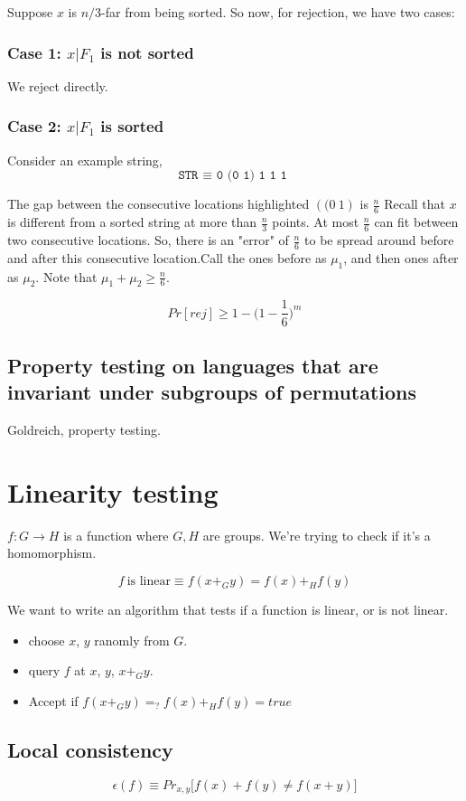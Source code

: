 Suppose $x$ is $n/3$-far from being sorted. So now, for rejection, we have two
cases:

\subsubsection{Case 1: $x|F_1$ is not sorted}
We reject directly.

\subsubsection{Case 2: $x|F_1$ is sorted}
Consider an example string,
$$\texttt{STR $\equiv$ 0~(0~1)~1~1~1~}$$

The gap between the consecutive locations highlighted $(\texttt(0~1)$ is $\frac{n}{6}$
Recall that $x$ is different from a sorted string at more than $\frac{n}{3}$ points.
At most $\frac{n}{6}$ can fit between two consecutive locations. So, there
is an "error" of $\frac{n}{6}$ to be spread around before and after this
consecutive location.Call the ones before as $\mu_1$, and then ones after
as $\mu_2$. Note that $\mu_1 + \mu_2 \geq \frac{n}{6}$.

$$Pr[rej] \geq 1 - \bigg(1 - \frac{1}{6} \bigg)^m$$

\subsection{Property testing on languages that are invariant under subgroups of permutations}
Goldreich, property testing.


\section{Linearity testing}
$f: G \to H$ is a function where $G, H$ are groups.  We're trying to check
if it's a homomorphism.

$$f~\text{is linear} \equiv f (x +_G y) = f(x) +_H f(y)$$

We want to write an algorithm that tests if a function is linear, or is not
linear.

\begin{itemize}
    \item choose $x$, $y$ ranomly from $G$.
    \item query $f$ at $x$, $y$, $x +_G y$.
    \item Accept if $f(x +_G y) =_? f(x) +_H f(y) = true$
\end{itemize}

\subsection{Local consistency}
$$\epsilon(f) \equiv Pr_{x, y} \bigg [ f(x) + f(y) \neq f(x + y) \bigg]$$

